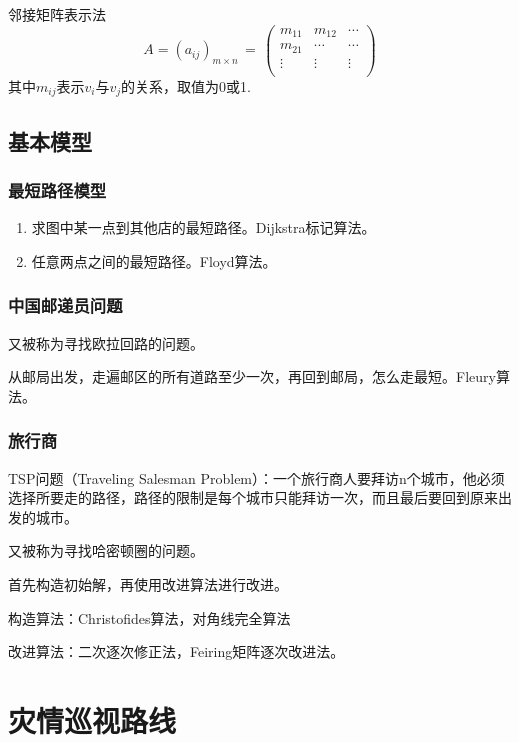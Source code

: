 邻接矩阵表示法
\begin{equation*}
A=(a_{ij})_{m\times n}\,=\,\left(
\begin{matrix}
m_{11} & m_{12} & \cdots \\
m_{21} & \cdots & \cdots \\
\vdots & \vdots & \vdots \\
\end{matrix}
\right)
\end{equation*}
其中$m_{ij}$表示$v_i$与$v_j$的关系，取值为0或1.

\subsection{基本模型}
\subsubsection{最短路径模型}
\begin{enumerate}[I]
\item 求图中某一点到其他店的最短路径。Dijkstra标记算法。
\item 任意两点之间的最短路径。Floyd算法。
\end{enumerate}
\subsubsection{中国邮递员问题}
又被称为寻找欧拉回路的问题。\par
从邮局出发，走遍邮区的所有道路至少一次，再回到邮局，怎么走最短。Fleury算法。
\subsubsection{旅行商}
TSP问题（Traveling Salesman Problem）：一个旅行商人要拜访n个城市，他必须选择所要走的路径，路径的限制是每个城市只能拜访一次，而且最后要回到原来出发的城市。\par
又被称为寻找哈密顿圈的问题。\par
首先构造初始解，再使用改进算法进行改进。\par
构造算法：Christofides算法，对角线完全算法\par
改进算法：二次逐次修正法，Feiring矩阵逐次改进法。

\newpage
\section{灾情巡视路线}
